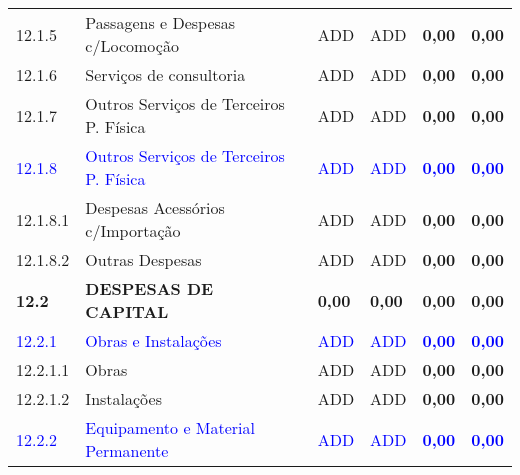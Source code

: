 \begin{table}[h]
{\begin{tabular}{|l|l|l|l|l|l|}
    \rowcolor{Gainsboro!60} 
    12.1.5 & 
    Passagens e Despesas c/Locomoção & 
    ADD & 
    ADD & 
    \textbf{0,00} &
    \textbf{0,00} \\    

    12.1.6 & 
    Serviços de consultoria & 
    ADD & 
    ADD &
    \textbf{0,00} &
    \textbf{0,00} \\ 

    \rowcolor{Gainsboro!60} 
    12.1.7 & 
    Outros Serviços de Terceiros P. Física & 
    ADD & 
    ADD & 
    \textbf{0,00} &
    \textbf{0,00} \\ \hline 

    \textcolor{blue}{12.1.8} &
    \textcolor{blue}{Outros Serviços de Terceiros P. Física} & 
    \textcolor{blue}{ADD} & 
    \textcolor{blue}{ADD} &  
    \textcolor{blue}{\textbf{0,00}} &
    \textcolor{blue}{\textbf{0,00}} \\  

    \rowcolor{Gainsboro!60} 
    12.1.8.1 & 
    Despesas Acessórios c/Importação & 
    ADD & 
    ADD & 
    \textbf{0,00} &
    \textbf{0,00} \\ 

    12.1.8.2 & 
    Outras Despesas & 
    ADD & 
    ADD &
    \textbf{0,00} &
    \textbf{0,00} \\ \hline
    
    \rowcolor{blue!40} \textbf{12.2} & 
    \textbf{DESPESAS DE CAPITAL} & 
    \textbf{0,00} & 
    \textbf{0,00} & 
    \textbf{0,00} & 
    \textbf{0,00} \\ \hline

    \rowcolor{Gainsboro!60} 
    \textcolor{blue}{12.2.1} &
    \textcolor{blue}{Obras e Instalações} & 
    \textcolor{blue}{ADD} & 
    \textcolor{blue}{ADD} &  
    \textcolor{blue}{\textbf{0,00}} &
    \textcolor{blue}{\textbf{0,00}} \\  

    12.2.1.1 & 
    Obras & 
    ADD & 
    ADD &
    \textbf{0,00} &
    \textbf{0,00} \\ 

    \rowcolor{Gainsboro!60}
    12.2.1.2 & 
    Instalações & 
    ADD & 
    ADD &
    \textbf{0,00} &
    \textbf{0,00} \\ \hline

    \textcolor{blue}{12.2.2} &
    \textcolor{blue}{Equipamento e Material Permanente} & 
    \textcolor{blue}{ADD} & 
    \textcolor{blue}{ADD} &  
    \textcolor{blue}{\textbf{0,00}} &
    \textcolor{blue}{\textbf{0,00}} \\  


\end{tabular}}
\end{table}
